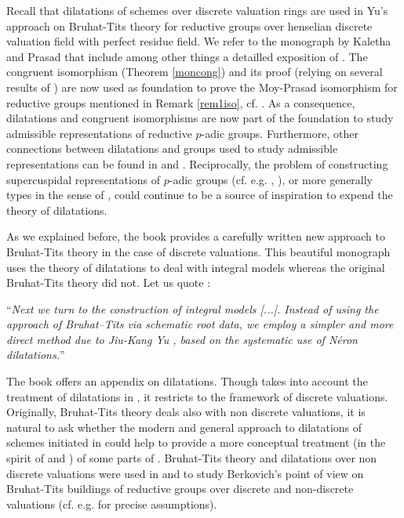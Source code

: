 \documentclass[10pt]{alggeom}
\theoremstyle{definition}
\numberwithin{equation}{section}
\begin{document}
 Recall that dilatations of schemes over discrete valuation rings are used in Yu's approach \cite{Yu15} on Bruhat-Tits theory for reductive groups over henselian discrete valuation field with perfect residue field. We refer to the monograph by Kaletha and Prasad \cite{KP22} that include among other things a detailled exposition of \cite{Yu15}. 
 The congruent isomorphism (Theorem \ref{moncong}) and its proof (relying on several results of \cite{MRR20}) are now used as foundation to prove the Moy-Prasad isomorphism for reductive groups mentioned in Remark \ref{rem1iso}, cf. \cite[Theorem 13.5.1 and its proof, Proposition A.5.19 (3) and its proof]{KP22}. As a consequence, dilatations and congruent isomorphisms are now part of the foundation to study admissible representations of reductive $p$-adic groups. Furthermore, other connections between dilatations and groups used to study admissible representations can be found in \cite[§10]{Yu15} and \cite[Example 1.4]{Ma23d}. Reciprocally, the problem of constructing supercuspidal representations of $p$-adic groups (cf. e.g. \cite[Remark/Conclusion]{Ma19o}, \cite{Ma19t, MY22}), or more generally types in the sense of \cite{BK98}, could continue to be a source of inspiration to expend the theory of dilatations.
 
  \rema 
 As we explained before, the book \cite{KP22} provides a carefully written new approach to Bruhat-Tits theory in the case of discrete valuations. This beautiful monograph uses the theory of dilatations to deal with integral models whereas the original Bruhat-Tits theory \cite{BT84} did not. Let us quote \cite[Introduction]{KP22}:
\begin{center}
   ``\textit{Next we
turn to the construction of integral models [...]. Instead of using the approach of Bruhat–Tits via schematic
root data, we employ a simpler and more direct method due to Jiu-Kang Yu
\cite{Yu15}, based on the systematic use of N\'eron dilatations.}''
 \end{center} 
The book \cite{KP22} offers an appendix on dilatations. Though \cite[Appendix A.5]{KP22} takes into account the treatment of dilatations in \cite{MRR20}, it restricts to the framework of discrete valuations.
Originally, Bruhat-Tits theory \cite{BT84} deals also with non discrete valuations, it is natural to ask whether the modern and general approach to dilatations of schemes initiated in \cite{MRR20} could help to provide a more conceptual treatment (in the spirit of \cite{Yu15} and \cite{KP22}) of some parts of \cite{BT84}. Bruhat-Tits theory and dilatations over non discrete valuations were used in \cite{RTW10} and \cite{Ma22} to study Berkovich's point of view \cite[Chap. 5]{Be90} on Bruhat-Tits buildings of reductive groups over discrete and non-discrete valuations (cf. e.g. \cite[1.3.4]{RTW10} for precise assumptions).
 \xrema
\end{document}

